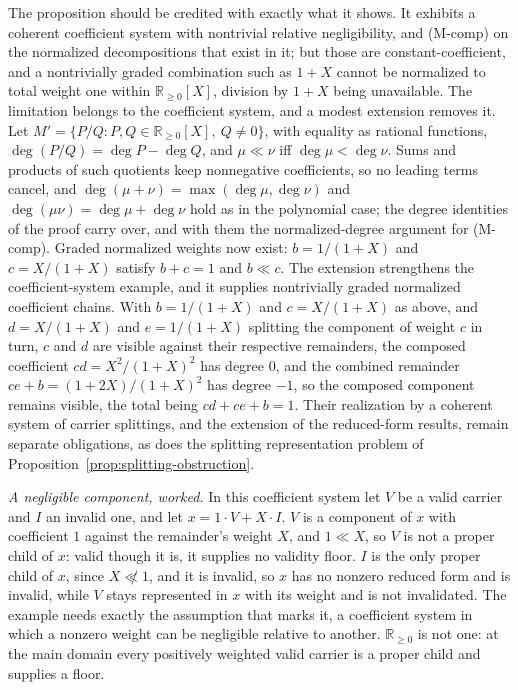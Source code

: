 \noindent The proposition should be credited with exactly what it shows. It exhibits a coherent coefficient system with nontrivial relative negligibility, and (M-comp) on the normalized decompositions that exist in it; but those are constant-coefficient, and a nontrivially graded combination such as $1 + X$ cannot be normalized to total weight one within $\mathbb{R}_{\ge 0}[X]$, division by $1 + X$ being unavailable. The limitation belongs to the coefficient system, and a modest extension removes it. Let $M' = \{P/Q : P, Q \in \mathbb{R}_{\ge 0}[X],\ Q \neq 0\}$, with equality as rational functions, $\deg(P/Q) = \deg P - \deg Q$, and $\mu \ll \nu$ iff $\deg\mu < \deg\nu$. Sums and products of such quotients keep nonnegative coefficients, so no leading terms cancel, and $\deg(\mu + \nu) = \max(\deg\mu, \deg\nu)$ and $\deg(\mu\nu) = \deg\mu + \deg\nu$ hold as in the polynomial case; the degree identities of the proof carry over, and with them the normalized-degree argument for (M-comp). Graded normalized weights now exist: $b = 1/(1+X)$ and $c = X/(1+X)$ satisfy $b + c = 1$ and $b \ll c$. The extension strengthens the coefficient-system example, and it supplies nontrivially graded normalized coefficient chains. With $b = 1/(1+X)$ and $c = X/(1+X)$ as above, and $d = X/(1+X)$ and $e = 1/(1+X)$ splitting the component of weight $c$ in turn, $c$ and $d$ are visible against their respective remainders, the composed coefficient $cd = X^{2}/(1+X)^{2}$ has degree $0$, and the combined remainder $ce + b = (1+2X)/(1+X)^{2}$ has degree $-1$, so the composed component remains visible, the total being $cd + ce + b = 1$. Their realization by a coherent system of carrier splittings, and the extension of the reduced-form results, remain separate obligations, as does the splitting representation problem of Proposition~\ref{prop:splitting-obstruction}.

\noindent\textit{A negligible component, worked.} In this coefficient system let $V$ be a valid carrier and $I$ an invalid one, and let $x = 1 \cdot V + X \cdot I$. $V$ is a component of $x$ with coefficient $1$ against the remainder's weight $X$, and $1 \ll X$, so $V$ is not a proper child of $x$: valid though it is, it supplies no validity floor. $I$ is the only proper child of $x$, since $X \not\ll 1$, and it is invalid, so $x$ has no nonzero reduced form and is invalid, while $V$ stays represented in $x$ with its weight and is not invalidated. The example needs exactly the assumption that marks it, a coefficient system in which a nonzero weight can be negligible relative to another. $\mathbb{R}_{\ge 0}$ is not one: at the main domain every positively weighted valid carrier is a proper child and supplies a floor.

